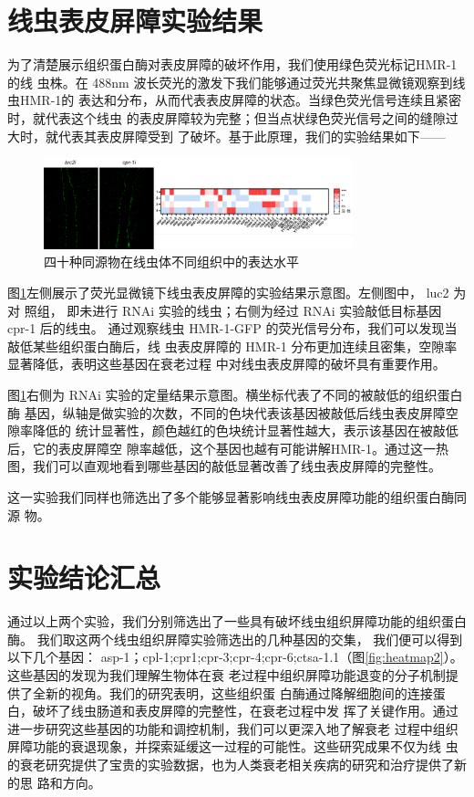 \section{线虫表皮屏障实验结果}

为了清楚展示组织蛋白酶对表皮屏障的破坏作用，我们使用绿色荧光标记HMR-1的线 虫株。在 488nm 波长荧光的激发下我们能够通过荧光共聚焦显微镜观察到线虫HMR-1的  表达和分布，从而代表表皮屏障的状态。当绿色荧光信号连续且紧密时，就代表这个线虫 的表皮屏障较为完整；但当点状绿色荧光信号之间的缝隙过大时，就代表其表皮屏障受到  了破坏。基于此原理，我们的实验结果如下——

\begin{figure}[H]
    \centering
    \includegraphics[width=0.8\textwidth]{img/fluorescence.png}
    \caption{四十种同源物在线虫体不同组织中的表达水平}
    \label{fig:fluorescence}
\end{figure}

图\ref{fig:fluorescence}左侧展示了荧光显微镜下线虫表皮屏障的实验结果示意图。左侧图中， luc2 为对  照组， 即未进行 RNAi 实验的线虫；右侧为经过 RNAi 实验敲低目标基因 cpr-1 后的线虫。 通过观察线虫 HMR-1-GFP 的荧光信号分布，我们可以发现当敲低某些组织蛋白酶后，线  虫表皮屏障的 HMR-1 分布更加连续且密集，空隙率显著降低，表明这些基因在衰老过程  中对线虫表皮屏障的破坏具有重要作用。

图\ref{fig:fluorescence}右侧为 RNAi 实验的定量结果示意图。横坐标代表了不同的被敲低的组织蛋白酶 基因，纵轴是做实验的次数，不同的色块代表该基因被敲低后线虫表皮屏障空隙率降低的 统计显著性，颜色越红的色块统计显著性越大，表示该基因在被敲低后，它的表皮屏障空 隙率越低，这个基因也越有可能讲解HMR-1。通过这一热图，我们可以直观地看到哪些基因的敲低显著改善了线虫表皮屏障的完整性。

这一实验我们同样也筛选出了多个能够显著影响线虫表皮屏障功能的组织蛋白酶同源 物。

\section{实验结论汇总}

通过以上两个实验，我们分别筛选出了一些具有破坏线虫组织屏障功能的组织蛋白酶。 我们取这两个线虫组织屏障实验筛选出的几种基因的交集， 我们便可以得到以下几个基因： asp-1；cpl-1;cpr1;cpr-3;cpr-4;cpr-6;ctsa-1.1（图\ref{fig:heatmap2}）。这些基因的发现为我们理解生物体在衰  老过程中组织屏障功能退变的分子机制提供了全新的视角。我们的研究表明，这些组织蛋  白酶通过降解细胞间的连接蛋白，破坏了线虫肠道和表皮屏障的完整性，在衰老过程中发  挥了关键作用。通过进一步研究这些基因的功能和调控机制，我们可以更深入地了解衰老  过程中组织屏障功能的衰退现象，并探索延缓这一过程的可能性。这些研究成果不仅为线  虫的衰老研究提供了宝贵的实验数据，也为人类衰老相关疾病的研究和治疗提供了新的思  路和方向。

